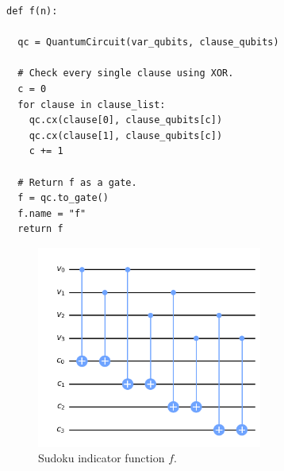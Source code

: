 \documentclass{article}
\begin{document}
\begin{verbatim}
def f(n):

  qc = QuantumCircuit(var_qubits, clause_qubits)

  # Check every single clause using XOR.
  c = 0
  for clause in clause_list:
    qc.cx(clause[0], clause_qubits[c])
    qc.cx(clause[1], clause_qubits[c])
    c += 1

  # Return f as a gate.
  f = qc.to_gate()
  f.name = "f"
  return f
\end{verbatim}
\begin{figure}[H]
  \centering
  \includegraphics[width=210pt]{Img/f-circuit.png}
  \caption{Sudoku indicator function $f$.}
\end{figure}
\newpage
\end{document}
